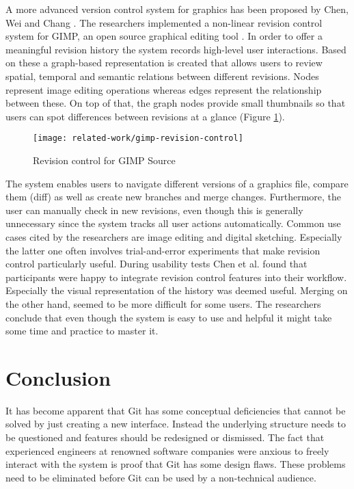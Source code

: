 A more advanced version control system for graphics has been proposed by Chen, Wei and Chang \cite{chen_nonlinear_2011}. The researchers implemented a non-linear revision control system for GIMP, an open source graphical editing tool \cite{_gimp_????}. In order to offer a meaningful revision history the system records high-level user interactions. Based on these a graph-based representation is created that allows users to review spatial, temporal and semantic relations between different revisions. Nodes represent image editing operations whereas edges represent the relationship between these. On top of that, the graph nodes provide small thumbnails so that users can spot differences between revisions at a glance (Figure \ref{fig:gimp-rev-control}).

\begin{figure}[h!]
 \centering
 \texttt{[image: related-work/gimp-revision-control]}
 \caption{Revision control for GIMP Source}
 \label{fig:gimp-rev-control}
\end{figure}


The system enables users to navigate different versions of a graphics file, compare them (diff) as well as create new branches and merge changes. Furthermore, the user can manually check in new revisions, even though this is generally unnecessary since the system tracks all user actions automatically. Common use cases cited by the researchers are image editing and digital sketching. Especially the latter one often involves trial-and-error experiments that make revision control particularly useful. During usability tests Chen et al. found that participants were happy to integrate revision control features into their workflow. Especially the visual representation of the history was deemed useful. Merging on the other hand, seemed to be more difficult for some users. The researchers conclude that even though the system is easy to use and helpful it might take some time and practice to master it. 

\section{Conclusion}
It has become apparent that Git has some conceptual deficiencies that cannot be solved by just creating a new interface. Instead the underlying structure needs to be questioned and features should be redesigned or dismissed. The fact that experienced engineers at renowned software companies were anxious to freely interact with the system is proof that Git has some design flaws. These problems need to be eliminated before Git can be used by a non-technical audience.


